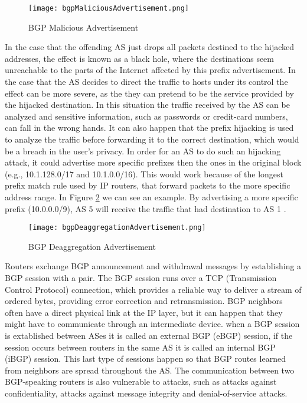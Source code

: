 \documentclass[11pt]{report}
\begin{document}
\begin{figure}[h!]
\centering
\texttt{[image: bgpMaliciousAdvertisement.png]}
\caption{BGP Malicious Advertisement}
\label{fig:bgpMaliciousAdvertisement}
\end{figure}

In the case that the offending AS just drops all packets destined to the hijacked addresses, the effect is known as a black hole, where the destinations seem unreachable to the parts of the Internet affected by this prefix advertisement. In the case that the AS decides to direct the traffic to hosts under its control the effect can be more severe, as the they can pretend to be the service provided by the hijacked destination. In this situation the traffic received by the AS can be analyzed and sensitive information, such as passwords or credit-card numbers, can fall in the wrong hands. It can also happen that the prefix hijacking is used to analyze the traffic before forwarding it to the correct destination, which would be a breach in the user's privacy. In order for an AS to do such an hijacking attack, it could advertise more specific prefixes then the ones in the original block (e.g., 10.1.128.0/17 and 10.1.0.0/16). This would work because of the longest prefix match rule used by IP routers, that forward packets to the more specific address range. In Figure \ref{fig:bgpDeaggregationAdvertisement} we can see an example. By advertising a more specific prefix (10.0.0.0/9), AS 5 will receive the traffic that had destination to AS 1 .

\begin{figure}[h!]
\centering
\texttt{[image: bgpDeaggregationAdvertisement.png]}
\caption{BGP Deaggregation Advertisement}
\label{fig:bgpDeaggregationAdvertisement}
\end{figure}


Routers exchange BGP announcement and withdrawal messages by establishing a BGP session with a pair. The BGP session runs over a TCP (Transmission Control Protocol) connection, which provides a reliable way to deliver a stream of ordered bytes, providing error correction and retransmission. BGP neighbors often have a direct physical link at the IP layer, but it can happen that they might have to communicate through an intermediate device. when a BGP session is extablished between ASes it is called an external BGP (eBGP) session, if the session occurs between routers in the same AS it is called an internal BGP (iBGP) session. This last type of sessions happen so that BGP routes learned from neighbors are spread throughout the AS. The communication between two BGP-speaking routers is also vulnerable to attacks, such as attacks against confidentiality, attacks against message integrity and denial-of-service attacks.
\end{document}
